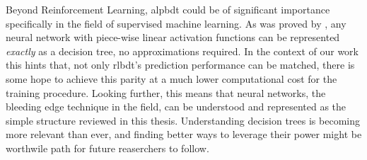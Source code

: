 Beyond Reinforcement Learning, \ac{alpbdt} could be of significant importance
specifically in the field of supervised machine learning. As was proved by
\cite{caglar22}, any neural network with piece-wise linear activation functions
can be represented \emph{exactly} as a decision tree, no approximations
required. In the context of our work this hints that, not only \ac{rlbdt}'s
prediction performance \cite{xiong} can be matched, there is some hope to
achieve this parity at a much lower computational cost for the training
procedure. Looking further, this means that neural networks, the bleeding edge
technique in the field, can be understood and represented as the simple
structure reviewed in this thesis. Understanding decision trees is becoming
more relevant than ever, and finding better ways to leverage their power might
be worthwile path for future reaserchers to follow.